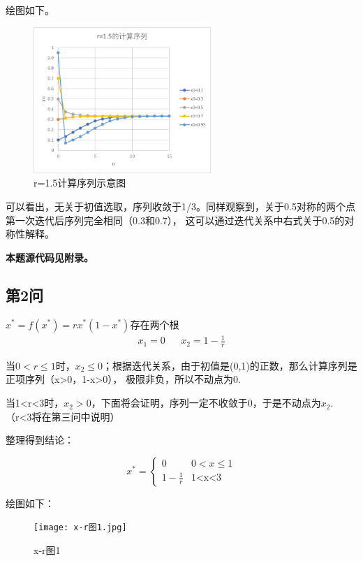 \documentclass[10pt, a4paper]{article}
\begin{document}
    绘图如下。
    \begin{figure}[H]
        \centering
        \includegraphics[width=0.6\textwidth]{r=1.5时计算序列.png}
        \caption{r=1.5计算序列示意图}\label{r=1.5计算序列示意图}
    \end{figure}

    可以看出，无关于初值选取，序列收敛于1/3。同样观察到，关于0.5对称的两个点第一次迭代后序列完全相同（0.3和0.7），
    这可以通过迭代关系中右式关于0.5的对称性解释。

    \textbf{本题源代码见附录。}

    \subsection{第2问}

    $x^*=f(x^*)=rx^*(1-x^*)$存在两个根
    \begin{align}
        x_1=0&&x_2=1-\frac{1}{r}
    \end{align}

    当$0<r\le 1$时，$x_2\le 0$；根据迭代关系，由于初值是(0,1)的正数，那么计算序列是正项序列（x>0，1-x>0），
    极限非负，所以不动点为0.

    当1<r<3时，$x_2>0$，下面将会证明，序列一定不收敛于0，于是不动点为$x_2$.（r<3将在第三问中说明）

    整理得到结论：

    $$x^*=
    \begin{cases}
    0& 0<x\le 1\\
    1-\frac{1}{r}& \text{1<x<3}
    \end{cases}$$
   
    绘图如下：

    \begin{figure}[H]
        \centering
        \texttt{[image: x-r图1.jpg]}
        \caption{x-r图1}\label{x-r图1}
    \end{figure}
\end{document}
